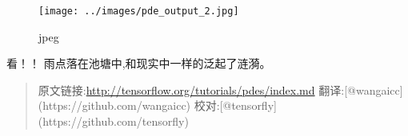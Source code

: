 \begin{figure}[htbp]
\centering
\texttt{[image: ../images/pde\_output\_2.jpg]}
\caption{jpeg}
\end{figure}

看！！ 雨点落在池塘中,和现实中一样的泛起了涟漪。

\begin{quote}
原文链接:\url{http://tensorflow.org/tutorials/pdes/index.md}
翻译:{[}@wangaicc{]}(https://github.com/wangaicc)
校对:{[}@tensorfly{]}(https://github.com/tensorfly)
\end{quote}
